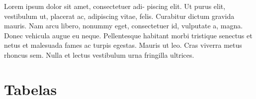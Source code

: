 \begin{question}[type={exam}]{2}
Lorem ipsum dolor sit amet, consectetuer adi-
piscing elit. Ut purus elit, vestibulum ut, placerat ac, adipiscing vitae,
felis. Curabitur dictum gravida mauris. Nam arcu libero, nonummy
eget, consectetuer id, vulputate a, magna. Donec vehicula augue
eu neque. Pellentesque habitant morbi tristique senectus et netus
et malesuada fames ac turpis egestas. Mauris ut leo. Cras viverra
metus rhoncus sem. Nulla et lectus vestibulum urna fringilla ultrices.
\end{question}
\vfill
\pagebreak
\section{Tabelas}

